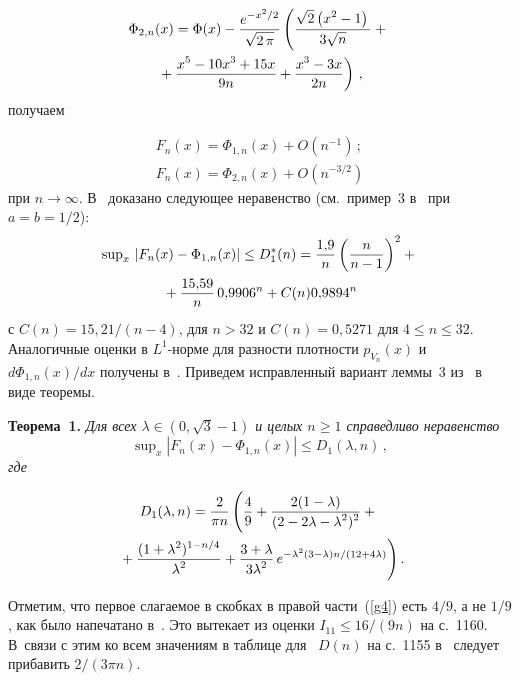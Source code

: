 \begin{multicols}{2}
\vspace*{-12pt}

\noindent
\begin{multline}
\Phi_{2,n}(x) = \Phi (x) -\displaystyle\frac{\displaystyle e^{-x^2/2}\mathstrut}{\displaystyle \sqrt{2\,\pi}\mathstrut}
\left( \displaystyle\frac{\displaystyle \sqrt{2}\left(x^2-1\right)\mathstrut}{\displaystyle 3\sqrt{n}\mathstrut}+{}\right.\\
\left.{}+
   \displaystyle\frac{\displaystyle x^5 -10x^3+15x\mathstrut}{\displaystyle 9n\mathstrut}+\displaystyle\frac{\displaystyle x^3-3x\mathstrut}{\displaystyle 2n\mathstrut}\right)\,,
   \label{g2b}
\end{multline}
получаем

\noindent
\begin{align*}
 F_n(x) = \Phi_{1,n}(x) + O(n ^{-1})\,;\\
 F_n(x) = \Phi_{2,n}(x) + O(n^{-3/2})
\end{align*}
 при $n \to \infty$.
В~\cite{6-cr}  доказано следующее неравенство (см.\ пример~3 в~\cite{6-cr} при  $a=b=1/2$):
\begin{multline}
\sup\nolimits_x\, |F_n(x) - \Phi_{1,n}(x)|
\leq D_1^*(n)=\displaystyle\frac{\displaystyle 1{,}9\mathstrut}{\displaystyle n\mathstrut} \left( \displaystyle\frac{\displaystyle n\mathstrut}{\displaystyle n-1\mathstrut}\right)^2
+{}\\
{}+\displaystyle\frac{\displaystyle 15{,}59\mathstrut}{\displaystyle n\mathstrut}\, 0{,}9906^n+ C(n) 0{,}9894^n
\label{g3} 
\end{multline}
с
$C(n) = 15{,}21/(n-4)$, для $n > 32$ и $C(n) = 0{,}5271$ для $4 \leq n \leq 32.$
%
Аналогичные оценки в   $L^1$-норме для разности плотности   $p_{V_n} (x)$ и
$d\Phi_{1,n}(x)/dx$ получены в~\cite{7-cr}.
%
Приведем исправленный вариант леммы~3 из~\cite{1-cr} в виде теоремы.

\medskip

\noindent
\textbf{Теорема~1.}
\textit{Для всех $\lambda \in (0,\sqrt{3}-1)$  и целых $n\geq 1$ справедливо неравенство
$$\sup\nolimits_x |F_n(x) - \Phi_{1,n}(x)| \leq D_1(\lambda, n)\,, $$
где}
\columnbreak

\noindent
\begin{multline}
D_1(\lambda, n) = \fr{2}{\pi n}\left(
\vphantom{\fr{(1+\lambda^2)^{1-n/4}}{\lambda^2}}
\fr{4}{9} +
\fr{2(1-\lambda)}{(2-2\lambda - \lambda^2)^2} +{}\right.\\
\!\left.{}+\fr{(1+\lambda^2)^{1-n/4}}{\lambda^2} +
\fr{3+\lambda}{3\lambda^2}\,e^{-\lambda^2(3-\lambda)n/(12+4\lambda)}
\right).\!\!
\label{g4}
\end{multline}

\smallskip

Отметим, что первое слагаемое в скобках в правой части~(\ref{g4}) есть 
$4/9$, а не $1/9$, как было напечатано в~\cite{1-cr}. Это  вытекает из оценки 
$ I_{11} \leq 16/(9n)$ на с.~1160. В~связи с этим ко всем значениям в таблице для~ $D(n)$ 
на с.~1155 в~\cite{1-cr} следует прибавить  $2/(3\pi n)$.


\end{multicols}
